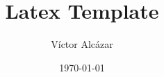 
\author{Víctor Alcázar}
\title{Latex Template}
\date{\today}

\maketitle
\tableofcontents


% 
% 




